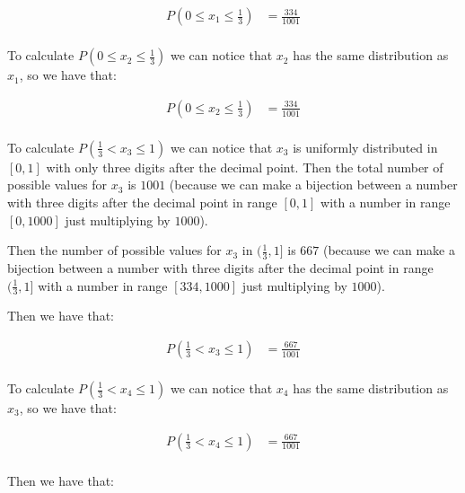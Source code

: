 \begin{equation*}
    \begin{split}
        P(0 \leq x_1 \leq \frac{1}{3}) & = \frac{334}{1001} \\
    \end{split}
\end{equation*}

To calculate $P(0 \leq x_2 \leq \frac{1}{3})$ we can notice that $x_2$ has
the same distribution as $x_1$, so we have that:

\begin{equation*}
    \begin{split}
        P(0 \leq x_2 \leq \frac{1}{3}) & = \frac{334}{1001} \\
    \end{split}
\end{equation*}

To calculate $P(\frac{1}{3} < x_3 \leq1)$ we can notice that $x_3$ is
uniformly distributed in $[0,1]$ with only three digits after the
decimal point. Then the total number of possible values for $x_3$ is
$1001$ (because we can make a bijection between a number with three
digits after the decimal point in range $[0,1]$ with a number in
range $[0,1000]$ just multiplying by $1000$).

Then the number of possible values for $x_3$ in $(\frac{1}{3}, 1]$ is $667$ (because we can make a bijection between a number with three
digits after the decimal point in range $(\frac{1}{3}, 1]$ with a
number in range $[334,1000]$ just multiplying by $1000$).

Then we have that:

\begin{equation*}
    \begin{split}
        P(\frac{1}{3} < x_3 \leq1) & = \frac{667}{1001} \\
    \end{split}
\end{equation*}

To calculate $P(\frac{1}{3} < x_4 \leq1)$ we can notice that $x_4$ has
the same distribution as $x_3$, so we have that:

\begin{equation*}
    \begin{split}
        P(\frac{1}{3} < x_4 \leq1) & = \frac{667}{1001} \\
    \end{split}
\end{equation*}

Then we have that:

